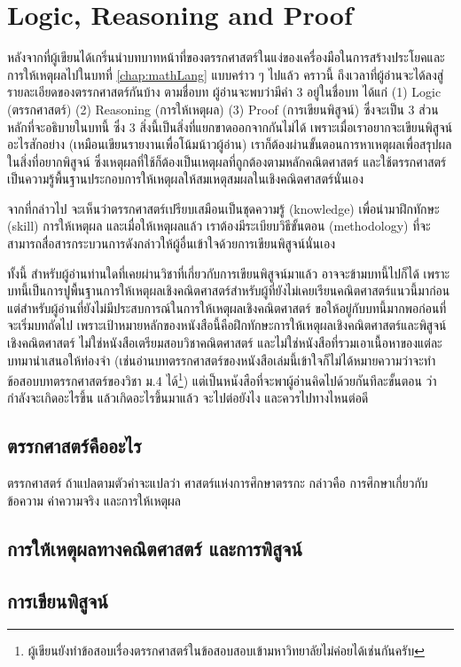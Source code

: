 \chapter{Logic, Reasoning and Proof}

หลังจากที่ผู้เขียนได้เกริ่นนำบทบาทหน้าที่ของตรรกศาสตร์ในแง่ของเครื่องมือในการสร้างประโยคและการให้เหตุผลไปในบทที่ \ref{chap:mathLang} แบบคร่าว ๆ ไปแล้ว
คราวนี้ ถึงเวลาที่ผู้อ่านจะได้ลงสู่รายละเอียดของตรรกศาสตร์กันบ้าง
ตามชื่อบท ผู้อ่านจะพบว่ามีคำ 3 อยู่ในชื่อบท ได้แก่ (1) Logic (ตรรกศาสตร์) (2) Reasoning (การให้เหตุผล) (3) Proof (การเขียนพิสูจน์) ซึ่งจะเป็น 3 ส่วนหลักที่จะอธิบายในบทนี้ ซึ่ง 3 สิ่งนี้เป็นสิ่งที่แยกขาดออกจากกันไม่ได้ เพราะเมื่อเราอยากจะเขียนพิสูจน์อะไรสักอย่าง (เหมือนเขียนรายงานเพื่อโน้มน้าวผู้อ่าน) เราก็ต้องผ่านขั้นตอนการหาเหตุผลเพื่อสรุปผลในสิ่งที่อยากพิสูจน์ ซึ่งเหตุผลที่ใช้ก็ต้องเป็นเหตุผลที่ถูกต้องตามหลักคณิตศาสตร์ และใช้ตรรกศาสตร์เป็นความรู้พื้นฐานประกอบการให้เหตุผลให้สมเหตุสมผลในเชิงคณิตศาสตร์นั่นเอง

จากที่กล่าวไป จะเห็นว่าตรรกศาสตร์เปรียบเสมือนเป็นชุดความรู้ (knowledge) เพื่อนำมาฝึกทักษะ (skill) การให้เหตุผล และเมื่อให้เหตุผลแล้ว เราต้องมีระเบียบวิธีขั้นตอน (methodology) ที่จะสามารถสื่อสารกระบวนการดังกล่าวให้ผู้อื่นเข้าใจด้วยการเขียนพิสูจน์นั่นเอง

ทั้งนี้ สำหรับผู้อ่านท่านใดที่เคยผ่านวิชาที่เกี่ยวกับการเขียนพิสูจน์มาแล้ว อาจจะข้ามบทนี้ไปก็ได้ เพราะบทนี้เป็นการปูพื้นฐานการให้เหตุผลเชิงคณิตศาสตร์สำหรับผู้ที่ยังไม่เคยเรียนคณิตศาสตร์แนวนี้มาก่อน
แต่สำหรับผู้อ่านที่ยังไม่มีประสบการณ์ในการให้เหตุผลเชิงคณิตศาสตร์ ขอให้อยู่กับบทนี้มากพอก่อนที่จะเริ่มบทถัดไป เพราะเป้าหมายหลักของหนังสือนี้คือฝึกทักษะการให้เหตุผลเชิงคณิตศาสตร์และพิสูจน์เชิงคณิตศาสตร์ ไม่ใช่หนังสือเตรียมสอบวิชาคณิตศาสตร์ และไม่ใช่หนังสือที่รวมเอาเนื้อหาของแต่ละบทมานำเสนอให้ท่องจำ (เช่นอ่านบทตรรกศาสตร์ของหนังสือเล่มนี้เข้าใจก็ไม่ได้หมายความว่าจะทำข้อสอบบทตรรกศาสตร์ของวิชา ม.4 ได้\footnote{ผู้เขียนยังทำข้อสอบเรื่องตรรกศาสตร์ในข้อสอบสอบเข้ามหาวิทยาลัยไม่ค่อยได้เช่นกันครับ}) แต่เป็นหนังสือที่จะพาผู้อ่านคิดไปด้วยกันทีละขั้นตอน ว่ากำลังจะเกิดอะไรขึ้น แล้วเกิดอะไรขึ้นมาแล้ว จะไปต่อยังไง และควรไปทางไหนต่อดี

\section{ตรรกศาสตร์คืออะไร}

ตรรกศาสตร์ ถ้าแปลตามตัวคำจะแปลว่า ศาสตร์แห่งการศึกษาตรรกะ กล่าวคือ การศึกษาเกี่ยวกับข้อความ ค่าความจริง และการให้เหตุผล



\section{การให้เหตุผลทางคณิตศาสตร์ และการพิสูจน์} \label{section:proof}





\section{การเขียนพิสูจน์}
















